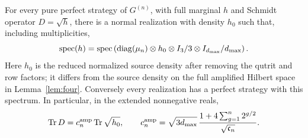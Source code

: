 \begin{lemma}\label{lem:spectrum}
For every pure perfect strategy of $G^{(n)}$, with full marginal $h$ and Schmidt operator $D=\sqrt h$, there is a normal realization with density $h_0$ such that, including multiplicities,
\begin{equation}\label{eq:specidentity}
 \operatorname{spec}(h)=\operatorname{spec}\left(\operatorname{diag}(\mu_n)\otimes h_0
                    \otimes I_3/3\otimes I_{d_{\max}}/d_{\max}\right).
\end{equation}
Here $h_0$ is the reduced normalized source density after removing the qutrit and row factors; it differs from the source density on the full amplified Hilbert space in Lemma~\ref{lem:four}. Conversely every realization has a perfect strategy with this spectrum. In particular, in the extended nonnegative reals,
\begin{equation}\label{eq:traceidentity}
 \operatorname{Tr} D=c^{\rm amp}_n\operatorname{Tr}\sqrt{h_0},\qquad
 c^{\rm amp}_n=\sqrt{3d_{\max}}\,\frac{1+4\sum_{g=1}^n2^{g/2}}{\sqrt{\mathfrak c_n}}.
\end{equation}
\end{lemma}
